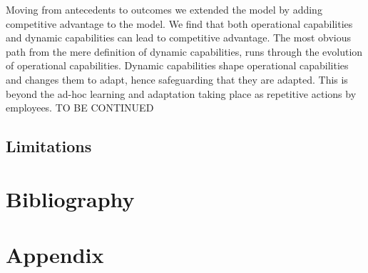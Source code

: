 \documentclass[review,fleqn]{elsarticle}\usepackage[]{graphicx}\usepackage[]{color}
\begin{document}
Moving from antecedents to outcomes we extended the \cite{Zollo2002a} model by adding
competitive advantage to the model. We find that both operational capabilities and dynamic
capabilities can lead to competitive advantage. The most obvious path from the mere
definition of dynamic capabilities, runs through the evolution of operational
capabilities. Dynamic capabilities shape operational capabilities and changes them to
adapt, hence safeguarding that they are adapted. This is beyond the ad-hoc learning and
adaptation taking place as repetitive actions by employees. TO BE CONTINUED

\subsection{Limitations}









\section{Bibliography}


\singlespacing




\section{Appendix}
\end{document}
